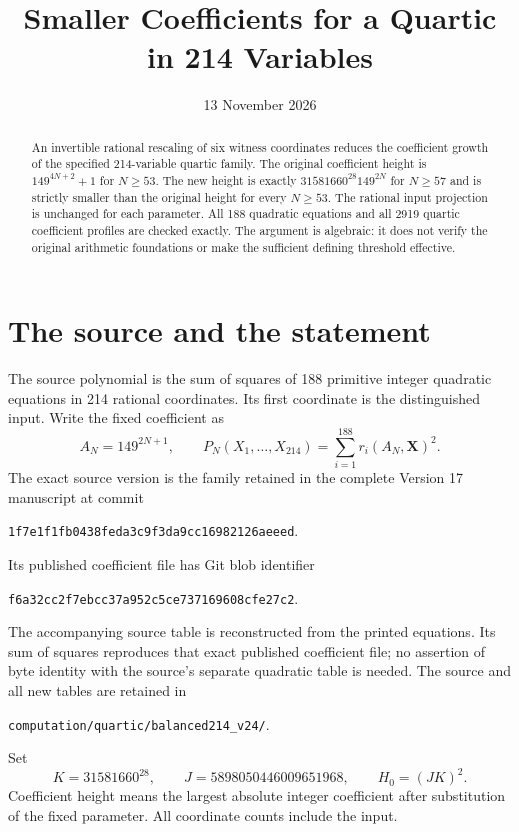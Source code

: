 \documentclass[11pt,a4paper]{article}
\title{Smaller Coefficients for a Quartic in 214 Variables}
\author{}\date{13 November 2026}
\begin{document}
\maketitle
\begin{abstract}
An invertible rational rescaling of six witness coordinates reduces the
coefficient growth of the specified 214-variable quartic family. The
original coefficient height is $149^{4N+2}+1$ for $N\ge53$. The new height
is exactly $31581660^{28}149^{2N}$ for $N\ge57$ and is strictly smaller
than the original height for every $N\ge53$. The rational input projection
is unchanged for each parameter. All 188 quadratic equations and all
2919 quartic coefficient profiles are checked exactly. The argument is
algebraic: it does not verify the original arithmetic foundations or
make the sufficient defining threshold effective.
\end{abstract}

\section{The source and the statement}
The source polynomial is the sum of squares of 188 primitive integer
quadratic equations in 214 rational coordinates. Its first coordinate
is the distinguished input. Write the fixed coefficient as
\[
 A_N=149^{2N+1},\qquad
 P_N(X_1,\ldots,X_{214})=\sum_{i=1}^{188}r_i(A_N,\boldsymbol X)^2.
\]
The exact source version is the family retained in the complete
Version 17 manuscript at commit
\begin{center}\small
\nolinkurl{1f7e1f1fb0438feda3c9f3da9cc16982126aeeed}.
\end{center}
Its published coefficient file has Git blob identifier
\begin{center}\small
\nolinkurl{f6a32cc2f7ebcc37a952c5ce737169608cfe27c2}.
\end{center}
The accompanying source table is reconstructed from the printed equations.
Its sum of squares reproduces that exact published coefficient file;
no assertion of byte identity with the source's separate quadratic table
is needed. The source and all new tables are retained in
\begin{center}\small
\nolinkurl{computation/quartic/balanced214_v24/}.
\end{center}

Set
\[
 K=31581660^{28},\qquad J=5898050446009651968,\qquad H_0=(JK)^2.
\]
Coefficient height means the largest absolute integer coefficient after
substitution of the fixed parameter. All coordinate counts include the input.
\end{document}
